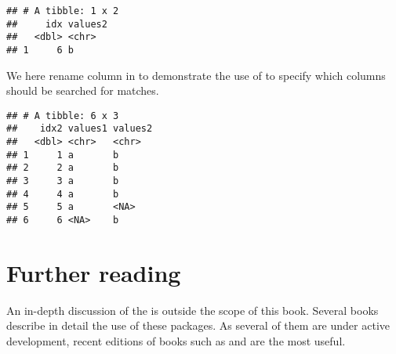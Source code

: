 \documentclass[krantz2]{krantz}\usepackage{knitr}
\begin{document}
\begin{knitrout}\footnotesize
{}\color{fgcolor}\begin{kframe}
\begin{alltt}
\hlstd{(}   
\end{alltt}


{\ttfamily\noindent\itshape\color{messagecolor}{\#\# Joining with `by = join\_by(idx)`}}\begin{verbatim}
## # A tibble: 1 x 2
##     idx values2
##   <dbl> <chr>  
## 1     6 b
\end{verbatim}
\end{kframe}
\end{knitrout}

We here rename column  in  to demonstrate the use of  to specify which columns should be searched for matches.

\begin{knitrout}\footnotesize
{}\color{fgcolor}\begin{kframe}
\begin{alltt}
 \hlkwb{<-}   
\hlstd{(}     \hlstd{=} \hlstd{(} \hlstd{=} \hlstd{))}
\end{alltt}
\begin{verbatim}
## # A tibble: 6 x 3
##    idx2 values1 values2
##   <dbl> <chr>   <chr>  
## 1     1 a       b      
## 2     2 a       b      
## 3     3 a       b      
## 4     4 a       b      
## 5     5 a       <NA>   
## 6     6 <NA>    b
\end{verbatim}
\end{kframe}
\end{knitrout}



\section{Further reading}
An in-depth discussion of the  is outside the scope of this book. Several books describe in detail the use of these packages. As several of them are under active development, recent editions of books such as  \autocite{Wickham2023} and  \autocite{Peng2022} are the most useful.
\end{document}
